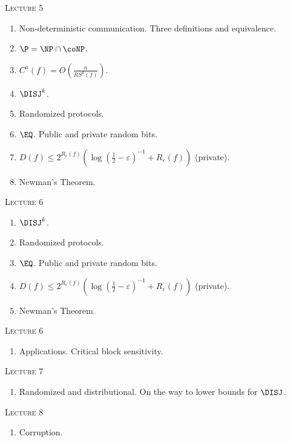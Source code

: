 \centerline{\textsc{Lecture 5}}

\begin{enumerate}
    \item Non-deterministic communication. Three definitions and equivalence.
    \item $\P = \NP \cap \coNP$.
    \item $C^a(f) = O\left(\frac{n}{RS^a(f)}\right)$.
    \item $\DISJ^k$.
    \item Randomized protocols.
    \item $\EQ$. Public and private random bits.
    \item $D(f) \le 2^{R_{\varepsilon}(f)} \left( \log(\frac{1}{2} - \varepsilon)^{-1} +
        R_{\varepsilon}(f) \right)$ (private).
    \item Newman's Theorem. 
\end{enumerate}

\centerline{\textsc{Lecture 6}}

\begin{enumerate}
    \item $\DISJ^k$.
    \item Randomized protocols.
    \item $\EQ$. Public and private random bits.
    \item $D(f) \le 2^{R_{\varepsilon}(f)} \left( \log(\frac{1}{2} - \varepsilon)^{-1} +
        R_{\varepsilon}(f) \right)$ (private).
    \item Newman's Theorem. 
\end{enumerate}



\centerline{\textsc{Lecture 6}}

\begin{enumerate}
    \item Applications. Critical block sensitivity.
\end{enumerate}

\centerline{\textsc{Lecture 7}}

\begin{enumerate}
    \item Randomized and distributional. On the way to lower bounds for $\DISJ$.
\end{enumerate}

\centerline{\textsc{Lecture 8}}

\begin{enumerate}
    \item Corruption.
\end{enumerate}